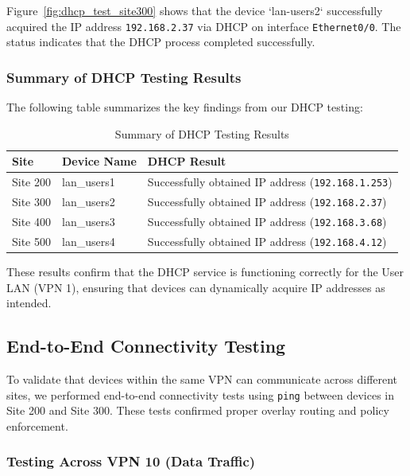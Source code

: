 \documentclass[12pt,english]{report}
\begin{document}
Figure~\ref{fig:dhcp_test_site300} shows that the device `lan-users2` successfully acquired the IP address \texttt{192.168.2.37} via DHCP on interface \texttt{Ethernet0/0}. The status indicates that the DHCP process completed successfully.

\subsubsection{Summary of DHCP Testing Results}

The following table summarizes the key findings from our DHCP testing:

\begin{table}[h]
\centering
\footnotesize
\caption{Summary of DHCP Testing Results}
\label{tab:dhcp_results}
\begin{tabularx}{\linewidth}{@{}>{\raggedright\arraybackslash}p{2.5cm}>{\raggedright\arraybackslash}p{3cm}>{\raggedright\arraybackslash}X@{}}
\toprule
\textbf{Site} & \textbf{Device Name} & \textbf{DHCP Result} \\
\midrule
Site 200 & lan\_users1 & Successfully obtained IP address (\texttt{192.168.1.253}) \\
\midrule
Site 300 & lan\_users2 & Successfully obtained IP address (\texttt{192.168.2.37}) \\
\midrule
Site 400 & lan\_users3 & Successfully obtained IP address (\texttt{192.168.3.68}) \\
\midrule
Site 500 & lan\_users4 & Successfully obtained IP address (\texttt{192.168.4.12}) \\
\bottomrule
\end{tabularx}
\end{table}

These results confirm that the DHCP service is functioning correctly for the User LAN (VPN 1), ensuring that devices can dynamically acquire IP addresses as intended.

\subsection{End-to-End Connectivity Testing}
\label{sec:end_to_end_connectivity}

To validate that devices within the same VPN can communicate across different sites, we performed end-to-end connectivity tests using \texttt{ping} between devices in Site 200 and Site 300. These tests confirmed proper overlay routing and policy enforcement.

\subsubsection{Testing Across VPN 10 (Data Traffic)}
\end{document}
